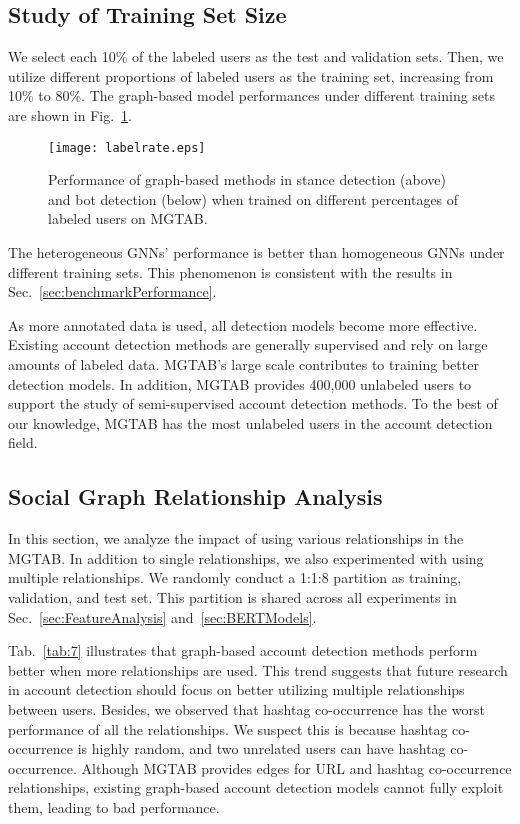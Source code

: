 \documentclass[10pt,twocolumn,letterpaper]{article}
\begin{document}
\subsection{Study of Training Set Size}
We select each 10\% of the labeled users as the test and validation sets. Then, we utilize different proportions of labeled users as the training set, increasing from 10\% to 80\%. The graph-based model performances under different training sets are shown in Fig.~\ref{fig:6}.

\begin{figure}[h]
\centering
\vspace{-0.2cm}
\centerline{\texttt{[image: labelrate.eps]}}
\vspace{-0.2cm}
\caption{Performance of graph-based methods in stance detection (above) and bot detection (below) when trained on different percentages of labeled users on MGTAB.}
\label{fig:6}
\end{figure}

The heterogeneous GNNs' performance is better than homogeneous GNNs under different training sets. This phenomenon is consistent with the results in Sec.~\ref{sec:benchmarkPerformance}.

As more annotated data is used, all detection models become more effective. Existing account detection methods are generally supervised and rely on large amounts of labeled data. MGTAB's large scale contributes to training better detection models. In addition, MGTAB provides 400,000 unlabeled users to support the study of semi-supervised account detection methods. To the best of our knowledge, MGTAB has the most unlabeled users in the account detection field.


\subsection{Social Graph Relationship Analysis}
In this section, we analyze the impact of using various relationships in the MGTAB. In addition to single relationships, we also experimented with using multiple relationships. We randomly conduct a 1:1:8 partition as training, validation, and test set. This partition is shared across all experiments in Sec.~\ref{sec:FeatureAnalysis} and~\ref{sec:BERTModels}.


Tab.~\ref{tab:7} illustrates that graph-based account detection methods perform better when more relationships are used. This trend suggests that future research in account detection should focus on better utilizing multiple relationships between users. Besides, we observed that hashtag co-occurrence has the worst performance of all the relationships. We suspect this is because hashtag co-occurrence is highly random, and two unrelated users can have hashtag co-occurrence. Although MGTAB provides edges for URL and hashtag co-occurrence relationships, existing graph-based account detection models cannot fully exploit them, leading to bad performance.
\end{document}
